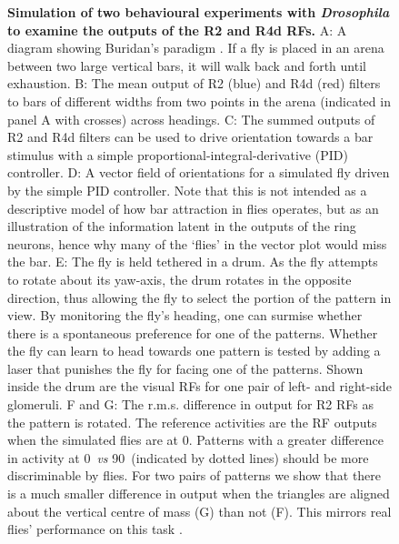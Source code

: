\begin{figure}[htp]
	\caption{
		{\bf Simulation of two behavioural experiments with \emph{Drosophila} to examine the outputs of the R2 and R4d RFs.}
		A: A diagram showing Buridan's paradigm \protect\cite{Gotz1980,Bulthoff1982}. If a fly is placed in an arena between two large vertical bars, it will walk back and forth until exhaustion.
		B: The mean output of R2 (blue) and R4d (red) filters to bars of different widths from two points in the arena (indicated in panel A with crosses) across headings.
		C: The summed outputs of R2 and R4d filters can be used to drive orientation towards a bar stimulus with a simple
		proportional-integral-derivative (PID) controller.
		D: A vector field of orientations for a simulated fly driven by the simple PID controller.
		Note that this is not intended as a descriptive model of how bar attraction in flies operates, but as an illustration of the information latent in the outputs of the ring neurons, hence why many of the `flies' in the vector plot would miss the bar.
		E: The fly is held tethered in a drum. As the fly attempts to rotate about its yaw-axis, the drum rotates in the opposite direction, thus allowing the fly to select the portion of the pattern in view.
		By monitoring the fly's heading, one can surmise whether there is a spontaneous preference for one of the patterns.
		Whether the fly can learn to head towards one pattern is tested by adding a laser that punishes the fly for facing one of the patterns.
		Shown inside the drum are the visual RFs for one pair of left- and right-side glomeruli.
		F and G: The r.m.s. difference in output for R2 RFs as the pattern is rotated.
		The reference activities are the RF outputs when the simulated flies are at 0\degree.
		Patterns with a greater difference in activity at 0\degree\ \emph{vs} 90\degree\ (indicated by dotted lines) should be more discriminable by flies.
		For two pairs of patterns we show that there is a much smaller difference in output when the triangles are aligned about the vertical centre of mass (G) than not (F).
		This mirrors real flies' performance on this task \cite{Ernst1999}.
	}
	\label{fig:recap}
\end{figure}

